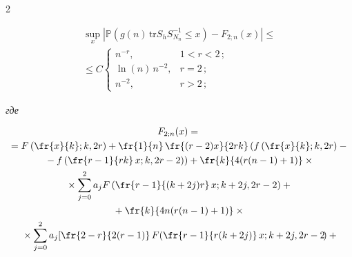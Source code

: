 \begin{multicols}{2}





\noindent


\begin{multline}


\label{eq10q}


\sup\limits_{x} \left\vert \mathbb{P}\left( g(n) \,\textrm{tr} S_h 


S^{-1}_{N_n} \leq x\right) - F_{2; n}(x) \right\vert \leq{}\\


{}\leq  C  


\begin{cases} 


n^{- r}, &  1 < r < 2\,;\\ 


\ln(n) \, n^{- 2}, &   r  = 2\,; \\ 


n^{- 2}, & r > 2\,;


 \end{cases}


\end{multline}


\textit{где}


\begin{multline*}




F_{2;n}(x) ={}\\


{}= F\left(\fr{x}{k};k,2r\right)


+ \fr{1}{n}\,\fr{(r-2)x}{2rk} \left(f\left(\fr{x}{k};k,2r\right) - {}\right.\\


\left.{}-


f\left( \fr{r-1}{rk}\,x;k,2r-2\right)\right) + 


\fr{k}{4(r(n-1)+1)}\times{}\\


{}\times \sum\limits_{j=0}^{2} a_j  F\left( \fr{r-1}{(k+2j)r} 


\,x;k+2j,2r-2\right) + {}\\


{}+ \fr{k}{4n(r(n-1)+1)} \times{}\\


{}\times 


\sum\limits_{j=0}^{2} a_j \! \left[ \fr{2-r}{2(r-1)} 


\,F\!\left( \fr{r-1}{r(k+2j)}\,x;k+2j,2r-2\!\right) +{} \right.\hspace*{-3.20157pt}



\end{multline*}
\end{multicols}
